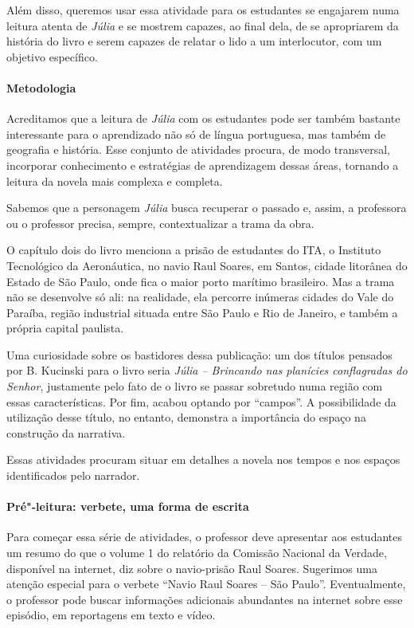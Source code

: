 \documentclass[12pt]{extarticle}
\begin{document}

Além disso, queremos usar essa atividade para os estudantes se engajarem
numa leitura atenta de \emph{Júlia} e se mostrem capazes, ao final dela,
de se apropriarem da história do livro e serem capazes de relatar o lido
a um interlocutor, com um objetivo específico.

\paragraph{Metodologia}

Acreditamos que a leitura de \emph{Júlia} com os estudantes pode ser
também bastante interessante para o aprendizado não só de língua
portuguesa, mas também de geografia e história. Esse conjunto de
atividades procura, de modo transversal, incorporar conhecimento e
estratégias de aprendizagem dessas áreas, tornando a leitura da novela
mais complexa e completa.

Sabemos que a personagem \emph{Júlia} busca recuperar o passado e,
assim, a professora ou o professor precisa, sempre, contextualizar a
trama da obra.

O capítulo dois do livro menciona a prisão de estudantes do ITA, o
Instituto Tecnológico da Aeronáutica, no navio Raul Soares, em Santos,
cidade litorânea do Estado de São Paulo, onde fica o maior porto
marítimo brasileiro. Mas a trama não se desenvolve só ali: na realidade,
ela percorre inúmeras cidades do Vale do Paraíba, região industrial
situada entre São Paulo e Rio de Janeiro, e também a própria capital
paulista.


Uma curiosidade sobre os bastidores dessa publicação: um dos títulos
pensados por B. Kucinski para o livro seria \emph{Júlia -- Brincando nas
planícies conflagradas do Senhor}, justamente pelo fato de o livro se
passar sobretudo numa região com essas características. Por fim, acabou
optando por ``campos''. A possibilidade da utilização desse título, no
entanto, demonstra a importância do espaço na construção da narrativa.

Essas atividades procuram situar em detalhes a novela nos tempos e nos
espaços identificados pelo narrador.

\paragraph{Pré"-leitura: verbete, uma forma de escrita}

Para começar essa série de atividades, o professor deve apresentar aos
estudantes um resumo do que o volume 1 do relatório da Comissão Nacional
da Verdade, disponível na internet, diz sobre o navio-prisão Raul
Soares. Sugerimos uma atenção especial para o verbete ``Navio Raul
Soares -- São Paulo''. Eventualmente, o professor pode buscar informações
adicionais abundantes na internet sobre esse episódio, em reportagens em
texto e vídeo.
\end{document}
